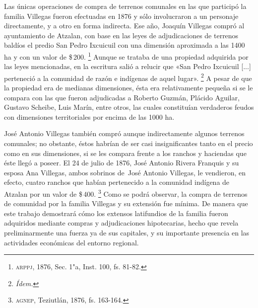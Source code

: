 \documentclass[14pt,twoside,final]{extbook} %
\let\oldfootnote\footnote
\renewcommand\footnote[1]{%
\oldfootnote{\hspace{1mm}#1}}
\begin{document}
Las únicas operaciones de compra de terrenos comunales en las que participó la familia Villegas fueron efectuadas en 1876 y sólo involucraron a un personaje directamente, y a otro en forma indirecta. Ese año, Joaquín Villegas compró al ayuntamiento de Atzalan, con base en las leyes de adjudicaciones de terrenos baldíos el predio San Pedro Ixcuicuil con una dimensión aproximada a las 1400 ha y con un valor de \$\,200.\footnote{\textsc{arppj}, 1876, Sec. 1"a, Inst. 100, fs. 81-82.} Aunque se trataba de una propiedad adquirida por las leyes mencionadas, en la escritura salió a relucir que «San Pedro Ixcuicuil [...] perteneció a la comunidad de razón e indígenas de aquel lugar».\footnote{\em Ídem.} A pesar de que la propiedad era de medianas dimensiones, ésta era relativamente pequeña si se le compara con las que fueron adjudicadas a Roberto Guzmán, Plácido Aguilar, Gustavo Scheibe, Luis Marín, entre otros, las cuales constituían verdaderos feudos con dimensiones territoriales por encima de las 1000 ha.

José Antonio Villegas también compró aunque indirectamente algunos terrenos comunales; no obstante, éstos habrían de ser casi insignificantes tanto en el precio como en sus dimensiones, si se les compara frente a los ranchos y haciendas que éste llegó a poseer. El 24 de julio de 1876, José Antonio Rivera Franquis y su esposa Ana Villegas, ambos sobrinos de~José Antonio Villegas, le vendieron, en efecto, cuatro ranchos que habían pertenecido a la comunidad indígena de Atzalan por un valor de \$\,400.\footnote{\textsc{agnep}, Teziutlán, 1876, fs. 163-164.} Como se podrá observar, la compra de terrenos de comunidad por la familia Villegas y su extensión fue mínima. De manera que este trabajo demostrará cómo los extensos latifundios de la familia fueron adquiridos mediante compras y adjudicaciones hipotecarias, hecho que revela preliminarmente una fuerza ya de sus capitales, y su importante presencia en las actividades económicas del entorno regional.
\end{document}
